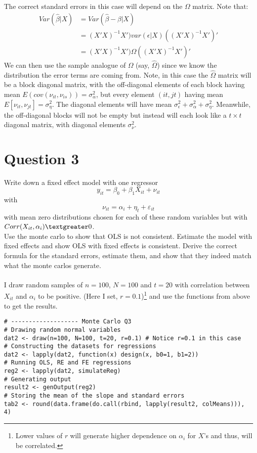 \documentclass{article}
\begin{document}
The correct standard errors in this case will depend on the $\Omega$
matrix. Note that:
\begin{equation*}
  \begin{aligned}
    Var(\hat \beta|X)&=Var(\hat \beta -\beta|X)\\
    &=(X'X)^{-1}X')var(\epsilon|X)((X'X)^{-1}X')'\\
    &=(X'X)^{-1}X')\Omega((X'X)^{-1}X')'
  \end{aligned}
\end{equation*}
We can then use the sample analogue of $\Omega$
(say, $\hat
\Omega$) since we know the distribution the error terms are coming
from.  Note, in this case the $\hat
\Omega$ matrix will be a block diagonal matrix, with the off-diagonal
elements of each block having mean
$E(cov(\nu_{it},\nu_{is}))=\sigma^2_{\alpha}$,
but every element $(it,jt)$
having mean $E[\nu_{it},\nu_{jt}]=\sigma^2_{\eta}$.
The diagonal elements will have mean
$\sigma^2_{\epsilon}+\sigma^2_{\alpha}+\sigma^2_{\eta}$.
Meanwhile, the off-diagonal blocks will not be empty but instead
will each look like a $t
\times t$ diagonal matrix, with diagonal elements $\sigma^2_{\nu}$.
 
\section*{Question 3}
Write down a fixed effect model with one regressor
\begin{equation}
  \label{eq:3}
  y_{it} = \beta_0 + \beta_1 X_{it} + \nu_{it}
\end{equation}
with
\begin{equation}
  \label{eq:4}
  \nu_{it} = \alpha_i + \eta_t + \varepsilon_{it}
\end{equation}
with mean zero distributions chosen for each of these random variables
but with $Corr(X_{it}, \alpha_i)\textgreater0$. \\
Use the monte carlo to show that OLS is not consistent. Estimate the
model with fixed effects and show OLS with fixed effects is
consistent. Derive the correct formula for the standard errors,
estimate them, and show that they indeed match what the monte carlos
generate. \\\myrule\\
I draw random samples of $n=100$, $N=100$ and $t=20$ with correlation
between $X_{it}$ and $\alpha_i$ to be positive. (Here I set,
$r=0.1$)\footnote{Lower values of $r$ will generate higher dependence
  on $\alpha_i$ for $X$'s and thus, will be correlated.} and use the
functions from above to get the results.
\begin{verbatim}
# ------------------- Monte Carlo Q3
# Drawing random normal variables
dat2 <- draw(n=100, N=100, t=20, r=0.1) # Notice r=0.1 in this case
# Constructing the datasets for regressions
dat2 <- lapply(dat2, function(x) design(x, b0=1, b1=2))
# Running OLS, RE and FE regressions
reg2 <- lapply(dat2, simulateReg)
# Generating output
result2 <- genOutput(reg2)
# Storing the mean of the slope and standard errors
tab2 <- round(data.frame(do.call(rbind, lapply(result2, colMeans))), 4)
\end{verbatim}
\end{document}

